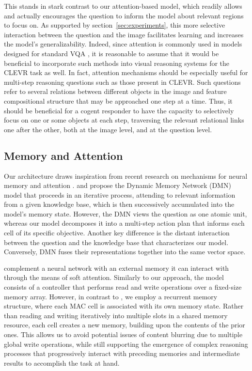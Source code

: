 \documentclass[fleqn]{article}
\newcommand{\secref}[1]{section~\ref{sec:#1}}
\begin{document}
This stands in stark contrast to our attention-based model, which readily allows and actually encourages the question to inform the model about relevant regions to focus on. As supported by \secref{experiments}, this more selective interaction between the question and the image facilitates learning and increases the model's generalizability. Indeed, since attention is commonly used in models designed for standard VQA \citep{vqa, vqaSurv,coatt,saAtt}, it is reasonable to assume that it would be beneficial to incorporate such methods into visual reasoning systems for the CLEVR task as well. In fact, attention mechanisms should be especially useful for multi-step reasoning questions such as those present in CLEVR. Such questions refer to several relations between different objects in the image and feature compositional structure that may be approached one step at a time. Thus, it should be beneficial for a cogent responder to have the capacity to selectively focus on one or some objects at each step, traversing the relevant relational links one after the other, both at the image level, and at the question level.

\subsection{Memory and Attention}
Our architecture draws inspiration from recent research on mechanisms for neural memory and attention \citep{dmn,vdmn,ntm,dnc}. \citet{dmn} and \citet{vdmn} propose the Dynamic Memory Network (DMN) model that proceeds in an iterative process, attending to relevant information from a given knowledge base, which is then successively accumulated into the model's memory state. However, the DMN views the question as one atomic unit, whereas our model decomposes it into a multi-step action plan that informs each cell of its specific objective. Another key difference is the distant interaction between the question and the knowledge base that characterizes our model. Conversely, DMN fuses their representations together into the same vector space.

\citet{ntm,dnc} complement a neural network with an external memory it can interact with through the means of soft attention. Similarly to our approach, the model consists of a controller that performs read and write operations over a fixed-size memory array. However, in contrast to \citet{ntm,dnc}, we employ a recurrent memory structure, where each MAC cell is associated with its own memory state. Rather than reading and writing iteratively into multiple slots in a shared memory resource, each cell creates a new memory, building upon the contents of the prior ones. This allows us to avoid potential issues of content blurring due to multiple global write operations, while still supporting the emergence of complex reasoning processes that progressively interact with preceding memories and intermediate results to accomplish the task at hand.
\end{document}
